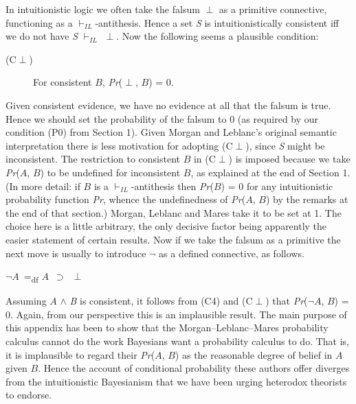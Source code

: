 \documentclass[
  11pt,
  letterpaper,
  DIV=11,
  numbers=noendperiod,
  oneside]{scrartcl}
\begin{document}
In intuitionistic logic we often take the falsum \({\perp}\) as a
primitive connective, functioning as a \(\vdash_{IL}\)-antithesis. Hence
a set \emph{S} is intuitionistically consistent iff we do not have
\emph{S} \(\vdash_{IL}\) \({\perp}\). Now the following seems a
plausible condition:

\begin{description}
\item[(C\({\perp}\))]
For consistent \(B\), \emph{Pr}(\({\perp}\), \(B\)) = 0.
\end{description}

Given consistent evidence, we have no evidence at all that the falsum is
true. Hence we should set the probability of the falsum to 0 (as
required by our condition (P0) from Section 1). Given Morgan and
Leblanc's original semantic interpretation there is less motivation for
adopting (C\({\perp}\)), since \emph{S} might be inconsistent. The
restriction to consistent \(B\) in (C\({\perp}\)) is imposed because we
take \emph{Pr}(\(A\), \(B\)) to be undefined for inconsistent \(B\), as
explained at the end of Section 1. (In more detail: if \(B\) is a
\(\vdash_{IL}\)-antithesis then \emph{Pr}(\(B\)) = 0 for any
intuitionistic probability function \emph{Pr}, whence the undefinedness
of \emph{Pr}(\(A\), \(B\)) by the remarks at the end of that section.)
Morgan, Leblanc and Mares take it to be set at 1. The choice here is a
little arbitrary, the only decisive factor being apparently the easier
statement of certain results. Now if we take the falsum as a primitive
the next move is usually to introduce \({\lnot}\) as a defined
connective, as follows.

\({\lnot}\)\(A\)~=\textsubscript{df} \(A\)~\({\supset}\)~\({\perp}\)

Assuming \(A\) \({\wedge}\) \emph{B} is consistent, it follows from (C4)
and (C\({\perp}\)) that \emph{Pr}(\({\lnot}\)\(A\), \(B\)) = 0. Again,
from our perspective this is an implausible result. The main purpose of
this appendix has been to show that the Morgan--Leblanc--Mares
probability calculus cannot do the work Bayesians want a probability
calculus to do. That is, it is implausible to regard their
\emph{Pr}(\(A\), \(B\)) as the reasonable degree of belief in \(A\)
given \(B\). Hence the account of conditional probability these authors
offer diverges from the intuitionistic Bayesianism that we have been
urging heterodox theorists to endorse.

\end{document}
